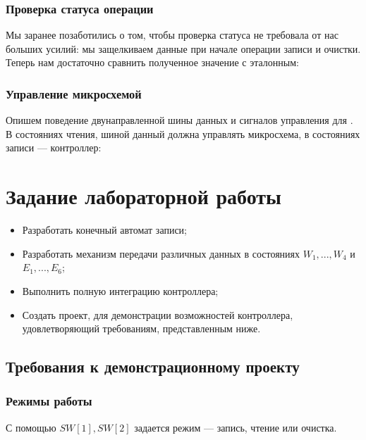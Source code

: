 \noindent
  
  
\subsubsection{Проверка статуса операции}

\par{Мы заранее позаботились о том, чтобы проверка статуса не требовала от нас больших усилий: мы защелкиваем данные при начале операции записи и очистки. Теперь нам достаточно сравнить полученное значение с эталонным:}
\noindent
  

\subsubsection{Управление микросхемой }
\par{Опишем поведение двунаправленной шины данных и сигналов управления для . В состояниях чтения, шиной данный должна управлять микросхема, в состояниях записи --- контроллер:}

\noindent
  

\pagebreak
\section{Задание лабораторной работы}

\begin{itemize}[noitemsep]
  \item Разработать конечный автомат записи;
  \item Разработать механизм передачи различных данных в состояниях $W_1, ..., W_4$ и $E_1, ..., E_6$;
  \item Выполнить полную интеграцию контроллера;
  \item Создать проект, для демонстрации возможностей контроллера, удовлетворяющий требованиям, представленным ниже.
\end{itemize}
\subsection{Требования к демонстрационному проекту}
\subsubsection{Режимы работы}
\par{С помощью $SW[1],SW[2]$ задается режим --- запись, чтение или очистка.}

